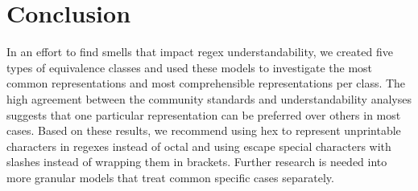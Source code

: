 \section{Conclusion}
\label{sec:conclusion}
In an effort to find smells that impact regex understandability, we created five types of equivalence classes and used these models to investigate the most common representations and most comprehensible representations per class. 
The high agreement between the community standards and understandability analyses suggests that one particular representation can be preferred over others in most cases. 
Based on these results, we recommend using hex to represent unprintable characters in regexes instead of octal and using escape special characters with slashes instead of wrapping them in brackets. Further research is needed into more granular models that treat common specific cases separately. %
